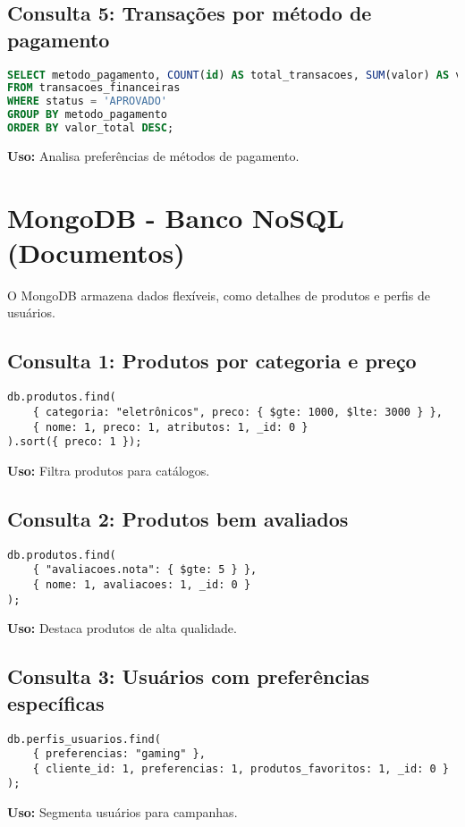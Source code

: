 \documentclass[a4paper,12pt]{article}
\begin{document}
\subsection{Consulta 5: Transações por método de pagamento}
\begin{lstlisting}[language=SQL]
SELECT metodo_pagamento, COUNT(id) AS total_transacoes, SUM(valor) AS valor_total
FROM transacoes_financeiras
WHERE status = 'APROVADO'
GROUP BY metodo_pagamento
ORDER BY valor_total DESC;
\end{lstlisting}
\textbf{Uso:} Analisa preferências de métodos de pagamento.

\section{MongoDB - Banco NoSQL (Documentos)}
O MongoDB armazena dados flexíveis, como detalhes de produtos e perfis de usuários.

\subsection{Consulta 1: Produtos por categoria e preço}
\begin{lstlisting}[language=MongoDB]
db.produtos.find(
    { categoria: "eletrônicos", preco: { $gte: 1000, $lte: 3000 } },
    { nome: 1, preco: 1, atributos: 1, _id: 0 }
).sort({ preco: 1 });
\end{lstlisting}
\textbf{Uso:} Filtra produtos para catálogos.

\subsection{Consulta 2: Produtos bem avaliados}
\begin{lstlisting}[language=MongoDB]
db.produtos.find(
    { "avaliacoes.nota": { $gte: 5 } },
    { nome: 1, avaliacoes: 1, _id: 0 }
);
\end{lstlisting}
\textbf{Uso:} Destaca produtos de alta qualidade.

\subsection{Consulta 3: Usuários com preferências específicas}
\begin{lstlisting}[language=MongoDB]
db.perfis_usuarios.find(
    { preferencias: "gaming" },
    { cliente_id: 1, preferencias: 1, produtos_favoritos: 1, _id: 0 }
);
\end{lstlisting}
\textbf{Uso:} Segmenta usuários para campanhas.
\end{document}
